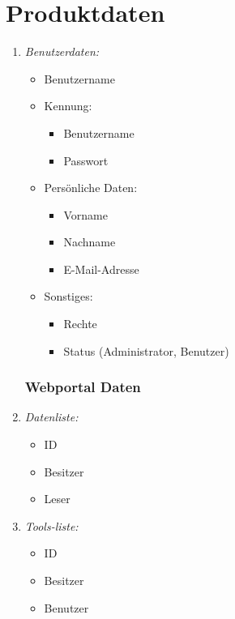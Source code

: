 \documentclass[parskip=full,11pt]{scrartcl}
\def\threedigits#1{%
  \ifnum#1<10 0\fi
  \ifnum#1<1 0\fi
  \number#1}
\begin{document}
\section{Produktdaten}
\begin{enumerate}[label={\textbf{/D\protect\threedigits{\theenumi}0/}}, leftmargin=*]
\subsubsection{Personendaten}
\item \textit{Benutzerdaten:}
\begin{itemize}
   \item Benutzername 
   \item Kennung:
   \begin{itemize}
     \item Benutzername
     \item Passwort
   \end{itemize}
 
   \item Persönliche Daten:
   \begin{itemize}
     \item Vorname
     \item Nachname
     \item E-Mail-Adresse
   \end{itemize}
   
    \item Sonstiges:
   \begin{itemize}
     \item Rechte
     \item Status (Administrator, Benutzer)    
   \end{itemize}
 
\end{itemize}

 
\subsubsection{Webportal Daten}
\item \textit{Datenliste:}
\begin{itemize}
\item ID
\item Besitzer
\item Leser
 \end{itemize}
 
 \item \textit{Tools-liste:}
\begin{itemize}
\item ID
\item Besitzer
\item Benutzer
 \end{itemize}

\end{enumerate}
\end{document}
